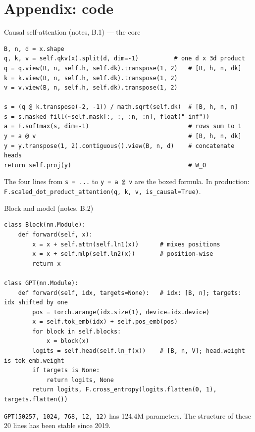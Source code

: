 \documentclass[11pt,aspectratio=169]{beamer}
\begin{document}
\section{Appendix: code}

\begin{frame}[fragile]{Causal self-attention (notes, B.1) --- the core}
\begin{lstlisting}[style=py]
B, n, d = x.shape
q, k, v = self.qkv(x).split(d, dim=-1)          # one d x 3d product
q = q.view(B, n, self.h, self.dk).transpose(1, 2)   # [B, h, n, dk]
k = k.view(B, n, self.h, self.dk).transpose(1, 2)
v = v.view(B, n, self.h, self.dk).transpose(1, 2)

s = (q @ k.transpose(-2, -1)) / math.sqrt(self.dk)  # [B, h, n, n]
s = s.masked_fill(~self.mask[:, :, :n, :n], float("-inf"))
a = F.softmax(s, dim=-1)                            # rows sum to 1
y = a @ v                                           # [B, h, n, dk]
y = y.transpose(1, 2).contiguous().view(B, n, d)    # concatenate heads
return self.proj(y)                                 # W_O
\end{lstlisting}
  \vspace{0.3em}
  The four lines from \texttt{s = ...} to \texttt{y = a @ v} are the boxed formula.
  In production: \texttt{F.scaled\_dot\_product\_attention(q, k, v, is\_causal=True)}.
\end{frame}

\begin{frame}[fragile]{Block and model (notes, B.2)}
\begin{lstlisting}[style=py]
class Block(nn.Module):
    def forward(self, x):
        x = x + self.attn(self.ln1(x))      # mixes positions
        x = x + self.mlp(self.ln2(x))       # position-wise
        return x

class GPT(nn.Module):
    def forward(self, idx, targets=None):   # idx: [B, n]; targets: idx shifted by one
        pos = torch.arange(idx.size(1), device=idx.device)
        x = self.tok_emb(idx) + self.pos_emb(pos)
        for block in self.blocks:
            x = block(x)
        logits = self.head(self.ln_f(x))    # [B, n, V]; head.weight is tok_emb.weight
        if targets is None:
            return logits, None
        return logits, F.cross_entropy(logits.flatten(0, 1), targets.flatten())
\end{lstlisting}
  \texttt{GPT(50257, 1024, 768, 12, 12)} has 124.4M parameters. The structure of these
  20 lines has been stable since 2019.
\end{frame}
\end{document}
